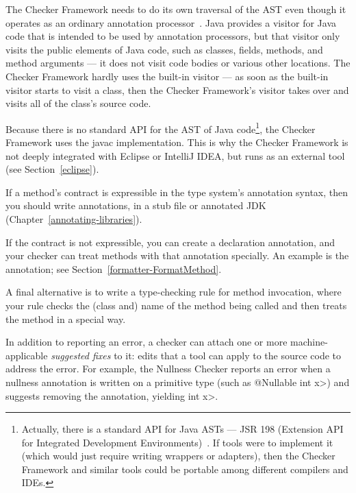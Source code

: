 
The Checker Framework needs to do its own traversal of the AST even though
it operates as an ordinary annotation processor~\cite{JSR269}.  Java
provides a visitor for Java code that is intended to be used by annotation
processors, but that visitor only
visits the public elements of Java code, such as classes, fields, methods,
and method arguments --- it does not visit code bodies or various other
locations.  The Checker Framework hardly uses the built-in visitor --- as
soon as the built-in visitor starts to visit a class, then the Checker
Framework's visitor takes over and visits all of the class's source code.

Because there is no standard API for the AST of Java
code\footnote{Actually, there is a standard API for Java ASTs --- JSR 198
  (Extension API for Integrated Development Environments)~\cite{JSR198}.
  If tools were to implement it (which would just require writing wrappers
  or adapters), then the Checker Framework and similar tools could be
  portable among different compilers and IDEs.}, the Checker Framework uses
the javac implementation.  This is why the Checker Framework is not deeply
integrated with Eclipse or IntelliJ IDEA, but runs as an external tool (see
Section~\ref{eclipse}).



If a method's contract is expressible in the type system's annotation
syntax, then you should write annotations, in a stub file or annotated JDK
(Chapter~\ref{annotating-libraries}).

If the contract is not expressible, you can create a declaration
annotation, and your checker can treat methods with that annotation
specially.  An example is the
 annotation; see
Section~\ref{formatter-FormatMethod}.

A final alternative is to write a type-checking rule for method invocation,
where your rule checks the (class and) name of the method
being called and then treats the method in a special way.



In addition to reporting an error, a checker can attach one or more
machine-applicable \emph{suggested fixes} to it:  edits that a tool can apply to
the source code to address the error.  For example, the Nullness Checker reports
an error when a nullness annotation is written on a primitive type (such as
\<@Nullable int x>) and suggests removing the annotation, yielding \<int x>.

